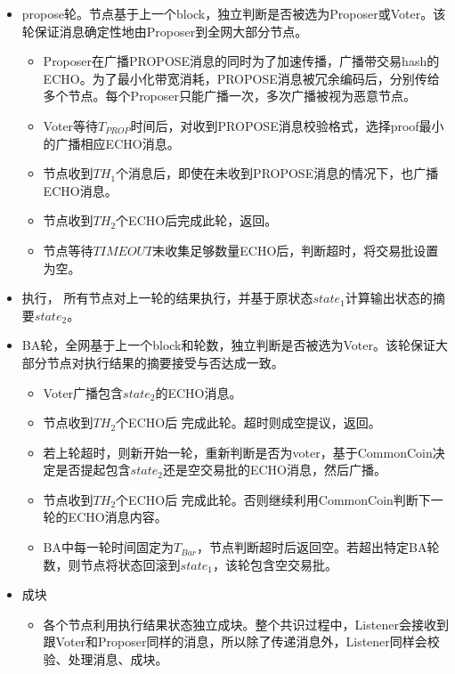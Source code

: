 \documentclass[12pt, UTF8]{article}
\begin{document}
\begin{itemize}
\item propose轮。节点基于上一个block，独立判断是否被选为Proposer或Voter。该轮保证消息确定性地由Proposer到全网大部分节点。
\begin{itemize}
\item Proposer在广播PROPOSE消息的同时为了加速传播，广播带交易hash的ECHO。为了最小化带宽消耗，PROPOSE消息被冗余编码后，分别传给多个节点。每个Proposer只能广播一次，多次广播被视为恶意节点。
\item Voter等待$T_{PROP}$时间后，对收到PROPOSE消息校验格式，选择proof最小的广播相应ECHO消息。
\item 节点收到$TH_1$个消息后，即使在未收到PROPOSE消息的情况下，也广播ECHO消息。
\item 节点收到$TH_2$个ECHO后完成此轮，返回。
\item 节点等待$TIMEOUT$未收集足够数量ECHO后，判断超时，将交易批设置为空。
\end{itemize}

\item 执行， 所有节点对上一轮的结果执行，并基于原状态$state_1$计算输出状态的摘要$state_2$。

\item BA轮，全网基于上一个block和轮数，独立判断是否被选为Voter。该轮保证大部分节点对执行结果的摘要接受与否达成一致。

\begin{itemize}
\item Voter广播包含$state_2$的ECHO消息。
\item 节点收到$TH_2$个ECHO后 完成此轮。超时则成空提议，返回。
\item 若上轮超时，则新开始一轮，重新判断是否为voter，基于CommonCoin决定是否提起包含$state_2$还是空交易批的ECHO消息，然后广播。
\item 节点收到$TH_2$个ECHO后 完成此轮。否则继续利用CommonCoin判断下一轮的ECHO消息内容。
\item BA中每一轮时间固定为$T_{Bar}$，节点判断超时后返回空。若超出特定BA轮数，则节点将状态回滚到$state_1$，该轮包含空交易批。
\end{itemize}

\item 成块
\begin{itemize}

\item 各个节点利用执行结果状态独立成块。整个共识过程中，Listener会接收到跟Voter和Proposer同样的消息，所以除了传递消息外，Listener同样会校验、处理消息、成块。
\end{itemize}
\end{itemize}
\end{document}
